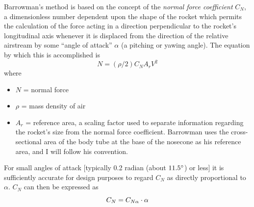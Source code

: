 Barrowman's method is based on the concept of the \emph{normal force
coefficient} $C_N$, a dimensionless number dependent upon the shape of the
rocket which permits the calculation of the force acting in a direction
perpendicular to the rocket's longitudinal axis whenever it is displaced from
the direction of the relative airstream by some ``angle of attack'' $\alpha$
(a pitching or yawing angle). The equation by which this is
accomplished is
\begin{equation*}
N = (\rho/2)C_N A_r V^{2}
\end{equation*}
where
\begin{itemize}[nosep,leftmargin=*,label={}]
  \item $N$ = normal force
  \item $\rho$ = mass density of air
  \item $A_r$ = reference area, a scaling factor used to separate information
  regarding the rocket's size from the normal force coefficient. Barrowman
  uses the cross-sectional area of the body tube at the base of the nosecone
  as his reference area, and I will follow his convention.
\end{itemize}
For small angles of attack [typically 0.2 radian (about $11.5^{\circ}$) or less]
it is sufficiently accurate for design purposes to regard $C_N$ as directly
proportional to $\alpha$. $C_N$ can then be expressed as
\begin{equation*}
C_N = C_{N\alpha} \cdot \alpha
\end{equation*}
